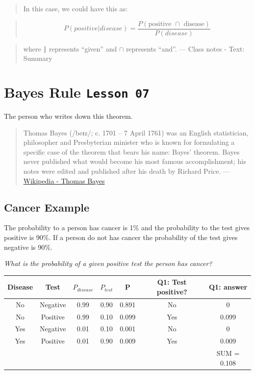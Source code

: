 \documentclass[]{book}
\begin{document}
\begin{quote}
In this case, we could have this as:
\end{quote}

\begin{quote}
\[P(positive|disease) = \frac{P(\text{positive }\cap\text{ disease})}{P(disease)}\]
\end{quote}

\begin{quote}
where ∣ represents ``given'' and \(\cap\) represents ``and''. --- Class
notes - Text: Summary
\end{quote}

\section{\texorpdfstring{Bayes Rule
\texttt{Lesson\ 07}}{Bayes Rule Lesson 07}}\label{bayes-rule-lesson-07}

The person who writes down this theorem.

\begin{quote}
Thomas Bayes (/beɪz/; c. 1701 -- 7 April 1761) was an English
statistician, philosopher and Presbyterian minister who is known for
formulating a specific case of the theorem that bears his name: Bayes'
theorem. Bayes never published what would become his most famous
accomplishment; his notes were edited and published after his death by
Richard Price. ---
\href{https://en.wikipedia.org/wiki/Thomas_Bayes}{Wikipedia - Thomas
Bayes}
\end{quote}

\subsection{Cancer Example}\label{cancer-example}

The probability to a person has cancer is 1\% and the probability to the
test gives positive is 90\%. If a person do not has cancer the
probability of the test gives negative is 90\%.

\emph{What is the probability of a given positive test the person has
cancer?}

\begin{longtable}[]{@{}ccccccc@{}}
\toprule
Disease & Test & \(P_{disease}\) & \(P_{test}\) & P & Q1: Test positive?
& Q1: answer\tabularnewline
\midrule
\endhead
No & Negative & 0.99 & 0.90 & 0.891 & No & 0\tabularnewline
No & Positive & 0.99 & 0.10 & 0.099 & Yes & 0.099\tabularnewline
Yes & Negative & 0.01 & 0.10 & 0.001 & No & 0\tabularnewline
Yes & Positive & 0.01 & 0.90 & 0.009 & Yes & 0.009\tabularnewline
& & & & & & SUM = 0.108\tabularnewline
\bottomrule
\end{longtable}
\end{document}
